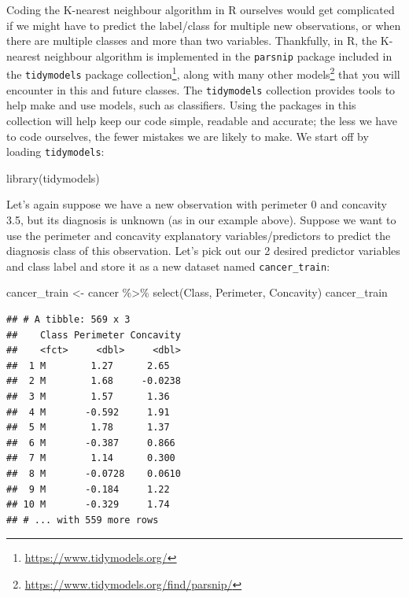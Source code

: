 \documentclass[
]{krantz}
\makeatletter
\newenvironment{Shaded}{\begin{snugshade}}{\end{snugshade}}
\newcommand{\FunctionTok}[1]{\textcolor[rgb]{0,0,0}{#1}}
\newcommand{\NormalTok}[1]{#1}
\newcommand{\OtherTok}[1]{\textcolor[rgb]{0.37,0.37,0.37}{#1}}
\newcommand{\SpecialCharTok}[1]{\textcolor[rgb]{0,0,0}{#1}}
\renewcommand{\href}[2]{#2\footnote{\url{#1}}}
\newenvironment{kframe}{%
\medskip{}
\setlength{\fboxsep}{.8em}
 \def\at@end@of@kframe{}%
 \ifinner\ifhmode%
  \def\at@end@of@kframe{\end{minipage}}%
  \begin{minipage}{\columnwidth}%
 \fi\fi%
 \def\FrameCommand##1{\hskip\@totalleftmargin \hskip-\fboxsep
 \colorbox{shadecolor}{##1}\hskip-\fboxsep
     \hskip-\linewidth \hskip-\@totalleftmargin \hskip\columnwidth}%
 \MakeFramed {\advance\hsize-\width
   \@totalleftmargin\z@ \linewidth\hsize
   \@setminipage}}%
 {\par\unskip\endMakeFramed%
 \at@end@of@kframe}
\renewenvironment{Shaded}{\begin{kframe}}{\end{kframe}}
\makeatother
\begin{document}
Coding the K-nearest neighbour algorithm in R ourselves would get complicated
if we might have to predict the label/class for multiple new observations, or
when there are multiple classes and more than two variables. Thankfully, in R,
the K-nearest neighbour algorithm is implemented in the \texttt{parsnip} package
included in the
\href{https://www.tidymodels.org/}{\texttt{tidymodels} package collection}, along with
many \href{https://www.tidymodels.org/find/parsnip/}{other models}
that you will encounter in this and future classes. The \texttt{tidymodels} collection
provides tools to help make and use models, such as classifiers. Using the packages
in this collection will help keep our code simple, readable and accurate; the
less we have to code ourselves, the fewer mistakes we are likely to make. We
start off by loading \texttt{tidymodels}:

\begin{Shaded}
\begin{Highlighting}[]
\FunctionTok{library}\NormalTok{(tidymodels)}
\end{Highlighting}
\end{Shaded}

Let's again suppose we have a new observation with perimeter 0 and concavity
3.5, but its diagnosis is unknown (as in our example above). Suppose we
want to use the perimeter and concavity explanatory variables/predictors to
predict the diagnosis class of this observation. Let's pick out our 2 desired
predictor variables and class label and store it as a new dataset named \texttt{cancer\_train}:

\begin{Shaded}
\begin{Highlighting}[]
\NormalTok{cancer\_train }\OtherTok{\textless{}{-}}\NormalTok{ cancer }\SpecialCharTok{\%\textgreater{}\%}
  \FunctionTok{select}\NormalTok{(Class, Perimeter, Concavity)}
\NormalTok{cancer\_train}
\end{Highlighting}
\end{Shaded}

\begin{verbatim}
## # A tibble: 569 x 3
##    Class Perimeter Concavity
##    <fct>     <dbl>     <dbl>
##  1 M        1.27      2.65  
##  2 M        1.68     -0.0238
##  3 M        1.57      1.36  
##  4 M       -0.592     1.91  
##  5 M        1.78      1.37  
##  6 M       -0.387     0.866 
##  7 M        1.14      0.300 
##  8 M       -0.0728    0.0610
##  9 M       -0.184     1.22  
## 10 M       -0.329     1.74  
## # ... with 559 more rows
\end{verbatim}
\end{document}
